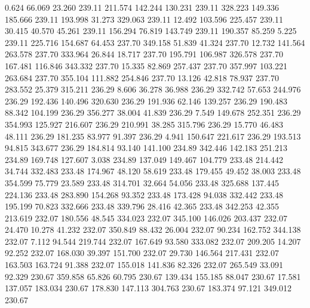    0.624   66.069   23.260       239.11
 211.574  142.244  130.231       239.11
 328.223  149.336  185.666       239.11
 193.998   31.273  329.063       239.11
  12.492  103.596  225.457       239.11
  30.415   40.570   45.261       239.11
 156.294   76.819  143.749       239.11
 190.357   85.259    5.225       239.11
 225.716  154.687   64.453       237.70
 349.158   51.839   41.324       237.70
  12.732  141.564  263.578       237.70
 333.964   26.844   18.717       237.70
 195.791  106.987  326.578       237.70
 167.481  116.846  343.332       237.70
  15.335   82.869  257.437       237.70
 357.997  103.221  263.684       237.70
 355.104  111.882  254.846       237.70
  13.126   42.818   78.937       237.70
 283.552   25.379  315.211       236.29
   8.606   36.278   36.988       236.29
 332.742   57.653  244.976       236.29
 192.436  140.496  320.630       236.29
 191.936   62.146  139.257       236.29
 190.483   88.342  104.199       236.29
 356.277   38.004   41.839       236.29
   7.549  149.678  252.351       236.29
 354.993  125.927  216.607       236.29
 210.991   38.285  315.796       236.29
  15.770   46.483   48.111       236.29
 181.235   83.977   91.397       236.29
   4.941  150.647  221.617       236.29
 193.513   94.815  343.677       236.29
 184.814   93.140  141.100       234.89
 342.446  142.183  251.213       234.89
 169.748  127.607    3.038       234.89
 137.049  149.467  104.779       233.48
 214.442   34.744  332.483       233.48
 174.967   48.120   58.619       233.48
 179.455   49.452   38.003       233.48
 354.599   75.779   23.589       233.48
 314.701   32.664   54.056       233.48
 325.688  137.445  224.136       233.48
 283.890  154.268   93.352       233.48
 173.428   94.038  332.442       233.48
 195.199   70.823  332.666       233.48
 339.796   28.416   42.365       233.48
 342.253   42.355  213.619       232.07
 180.556   48.545  334.023       232.07
 345.100  146.026  203.437       232.07
  24.470   10.278   41.232       232.07
 350.849   88.432   26.004       232.07
  90.234  162.752  344.138       232.07
   7.112   94.544  219.744       232.07
 167.649   93.580  333.082       232.07
 209.205   14.207   92.252       232.07
 168.030   39.397  151.700       232.07
  29.730  146.564  217.431       232.07
 163.503  163.724   91.388       232.07
 155.018  141.836   82.326       232.07
 265.549   33.091   92.329       230.67
 359.858   65.826   60.795       230.67
 139.434  155.185   88.047       230.67
  17.581  137.057  183.034       230.67
 178.830  147.113  304.763       230.67
 183.374   97.121  349.012       230.67
